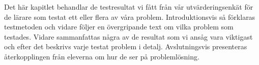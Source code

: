 \textcolor{Mahogany}{Det här kapitlet behandlar de testresultat vi fått från vår utvärderingsenkät för de lärare som testat ett eller flera av våra problem. Introduktionsvis så förklaras testmetoden och vidare följer en övergripande text om vilka problem som testades. Vidare sammanfattas några av de resultat som vi ansåg vara viktigast och efter det beskrivs varje testat problem i detalj. Avslutningsvis presenteras återkopplingen från eleverna om hur de ser på problemlösning.}